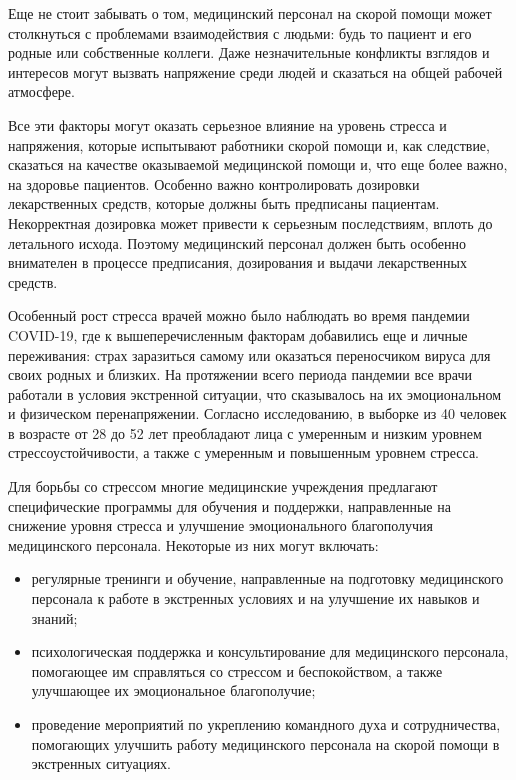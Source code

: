 Еще не стоит забывать о том, медицинский персонал на скорой помощи может столкнуться с проблемами взаимодействия с людьми: будь то пациент и его родные или собственные коллеги. Даже незначительные конфликты взглядов и интересов могут вызвать напряжение среди людей и сказаться на общей рабочей атмосфере.

Все эти факторы могут оказать серьезное влияние на уровень стресса и напряжения, которые испытывают работники скорой помощи и, как следствие, сказаться на качестве оказываемой медицинской помощи и, что еще более важно, на здоровье пациентов. Особенно важно контролировать дозировки лекарственных средств, которые должны быть предписаны пациентам. Некорректная дозировка может привести к серьезным последствиям, вплоть до летального исхода. Поэтому медицинский персонал должен быть особенно внимателен в процессе предписания, дозирования и выдачи лекарственных средств.

Особенный рост стресса врачей можно было наблюдать во время пандемии COVID-19, где к вышеперечисленным факторам добавились еще и личные переживания: страх заразиться самому или оказаться переносчиком вируса для своих родных и близких. На протяжении всего периода пандемии все врачи работали в условия экстренной ситуации, что сказывалось на их эмоциональном и физическом перенапряжении. Согласно исследованию, в выборке из 40 человек в возрасте от 28 до 52 лет преобладают лица с умеренным и низким уровнем стрессоустойчивости, а также с умеренным и повышенным уровнем стресса.

Для борьбы со стрессом многие медицинские учреждения предлагают специфические программы для обучения и поддержки, направленные на снижение уровня стресса и улучшение эмоционального благополучия медицинского персонала. Некоторые из них могут включать:
\begin{itemize}
\item регулярные тренинги и обучение, направленные на подготовку медицинского персонала к работе в экстренных условиях и на улучшение их навыков и знаний;

\item психологическая поддержка и консультирование для медицинского персонала, помогающее им справляться со стрессом и беспокойством, а также улучшающее их эмоциональное благополучие;

\item проведение мероприятий по укреплению командного духа и сотрудничества, помогающих улучшить работу медицинского персонала на скорой помощи в экстренных ситуациях.
\end{itemize}

